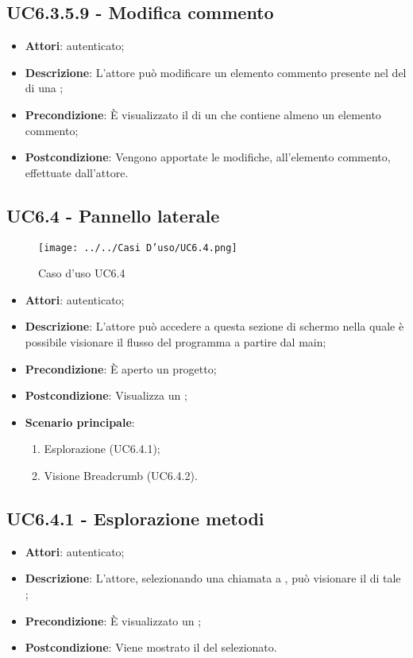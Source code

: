 \subsection{UC6.3.5.9 - Modifica commento}
\label{ssec:UC6.3.5.9}
\begin{itemize}
\item \textbf{Attori}:  autenticato;
\item \textbf{Descrizione}: L'attore può modificare un elemento commento presente nel  del  di una ;
\item \textbf{Precondizione}: È visualizzato il  di un  che contiene almeno un elemento commento;
\item \textbf{Postcondizione}: Vengono apportate le modifiche, all'elemento commento, effettuate dall'attore.
\end{itemize}
\newpage
\subsection{UC6.4 - Pannello laterale}
\label{ssec:UC6.4}

\begin{figure}[h!]
\centering
\texttt{[image: ../../Casi D'uso/UC6.4.png]}
\caption{Caso d'uso UC6.4}
 \end{figure}
\begin{itemize}
\item \textbf{Attori}:  autenticato;
\item \textbf{Descrizione}: L'attore può accedere a questa sezione di schermo nella quale è possibile visionare il flusso del programma a partire dal  main;
\item \textbf{Precondizione}: È aperto un progetto;
\item \textbf{Postcondizione}: Visualizza un ;
\item \textbf{Scenario principale}: \begin{enumerate}\item Esplorazione  (UC6.4.1);\item Visione Breadcrumb (UC6.4.2).
 \end{enumerate}
\end{itemize}
\subsection{UC6.4.1 - Esplorazione metodi}
\label{ssec:UC6.4.1}
\begin{itemize}
\item \textbf{Attori}:  autenticato;
\item \textbf{Descrizione}: L'attore, selezionando una chiamata a , può visionare il  di tale ;
\item \textbf{Precondizione}: È visualizzato un ;
\item \textbf{Postcondizione}: Viene mostrato il  del  selezionato.
\end{itemize}
